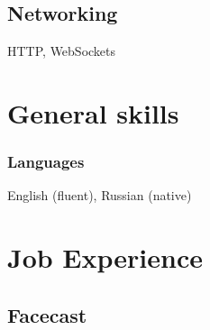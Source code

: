 \documentclass[a4paper,11pt]{article}
\begin{document}
\subsection{Networking}
HTTP, WebSockets

\section{General skills}

\subsubsection{Languages}
English (fluent), Russian (native)

\section{Job Experience}

\subsection{Facecast}
\end{document}
